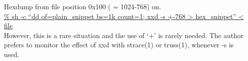 \documentclass{ctexart}
\begin{document}
\begin{adjustwidth}{1cm}{0cm}
\noindent Hexdump from file position 0x100 ( = 1024-768) on. \\
\underline{\% sh -c ``dd of=plain\_snippet bs=1k count=1; xxd -s +-768 >
  hex\_snippet'' < file} \\ 

\noindent However, this is a rare situation and the use of `+' is rarely needed.
The author prefers to monitor the effect of xxd with strace(1) or truss(1),
whenever -s is used. 
\end{adjustwidth}
\end{document}

